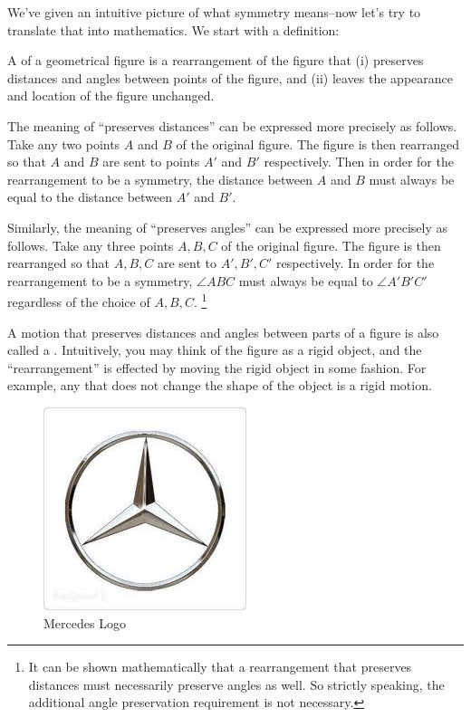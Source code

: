 We've given an intuitive picture of what symmetry means--now let's try to translate that into mathematics. We start with a definition:

\begin{defn} A  of a geometrical figure is a rearrangement of the figure that (i) preserves distances and angles between points of the figure,
 and (ii) leaves the appearance and location of the figure unchanged.
\end{defn}

\begin{rem}
The meaning  of ``preserves distances'' can be expressed more precisely as follows. Take any two points $A$ and $B$ of the original figure. The figure is then rearranged so that $A$ and $B$ are sent to points $A'$ and $B'$ respectively. Then in order for the rearrangement to be  a symmetry, the distance between $A$ and $B$ must always be equal to the distance between $A'$ and $B'$.

Similarly, the meaning of  ``preserves angles'' can be expressed more precisely as follows. Take any three points $A, B, C$ of the original figure. The figure is then rearranged so that $A, B, C$ are sent to $A', B', C'$ respectively. In order for the rearrangement to be  a symmetry, $\angle ABC$ must always be equal to $\angle A'B'C'$ regardless of the choice of $A, B, C$.
\footnote{It can be shown mathematically that a rearrangement that preserves distances must necessarily preserve angles as well. So strictly speaking, the additional  angle preservation  requirement is not necessary.}
\end{rem}

A motion that preserves distances and angles between parts of a figure is also called a . Intuitively, you may think of the figure as a rigid object, and the ``rearrangement'' is effected by moving the rigid object in some fashion.  For example, any   that does not change the shape of the object is a rigid motion.

\begin{figure}[ht]
\begin{center}
\includegraphics[scale=0.35]{images/mercedes.jpg}
\caption{Mercedes Logo}\label{mercedes}
\end{center}
\end{figure}


